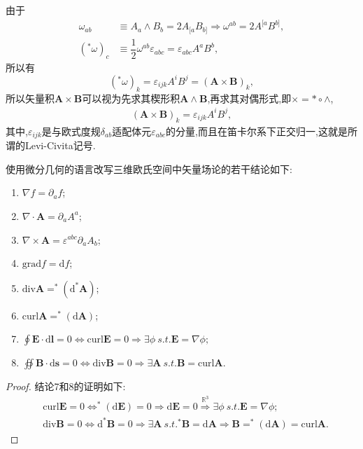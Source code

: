 由于
$$
\begin{aligned}
\omega_{ab}&\equiv A_a\wedge B_b=2A_{[a}B_{b]}\Rightarrow \omega^{ab}= 2A^{[a}B^{b]},\\
(^*\omega)_c&\equiv\dfrac{1}{2}\omega^{ab}\varepsilon_{abc}=\varepsilon_{abc}A^aB^b,
\end{aligned}
$$
所以有
$$
(^*\omega)_k=\varepsilon_{ijk}A^iB^j=(\boldsymbol{A}\times\boldsymbol{B})_k,
$$
所以矢量积$\boldsymbol{A}\times \boldsymbol{B}$可以视为先求其楔形积$\boldsymbol{A}\wedge\boldsymbol{B}$,再求其对偶形式,即$\times =*\circ \wedge$,
\begin{align}
    (\boldsymbol{A}\times \boldsymbol{B})_k=\varepsilon_{ijk}A^iB^j,
\end{align}
其中,$\varepsilon_{ijk}$是与欧式度规$\delta_{ab}$适配体元$\varepsilon_{abc}$的分量,而且在笛卡尔系下正交归一,这就是所谓的Levi-Civita记号.

使用微分几何的语言改写三维欧氏空间中矢量场论的若干结论如下:
\begin{enumerate}
\item $\nabla f=\partial_a f$;
\item $\nabla \cdot \boldsymbol{A}=\partial_a A^a$;
\item $\nabla \times \boldsymbol{A}=\varepsilon^{abc}\partial_aA_b$;
\item $\text{grad}f=\text{d}f$;
\item $\text{div}\boldsymbol{A}=^*(\text{d}^*\boldsymbol{A})$;
\item $\text{curl}\boldsymbol{A}=^*(\text{d}\boldsymbol{A})$;
\item $\displaystyle \oint\boldsymbol{E}\cdot \text{d}\boldsymbol{l}=0\Leftrightarrow\text{curl} \boldsymbol{E}=0\Rightarrow \exists \phi \ s.t. \boldsymbol{E}=\nabla \phi;$
\item $\displaystyle \oiint \boldsymbol{B}\cdot \text{d}\boldsymbol{s}=0\Leftrightarrow \text{div}\boldsymbol{B}=0\Rightarrow \exists \boldsymbol{A}\ s.t. \boldsymbol{B}=\text{curl}\boldsymbol{A}.$
\end{enumerate}
\begin{proof}
    结论7和8的证明如下:
    $$
    \begin{aligned}
       & \text{curl}\boldsymbol{E}=0\Leftrightarrow^*(\text{d}\boldsymbol{E})=0\Rightarrow\text{d}\boldsymbol{E}=0\stackrel{\mathbb{R}^3}{\Longrightarrow}\exists \phi \ s.t. \boldsymbol{E}=\nabla \phi;\\
    &\text{div}\boldsymbol{B}=0\Leftrightarrow \text{d}^*\boldsymbol{B}=0\Rightarrow \exists \boldsymbol{A}\ s.t. ^*\boldsymbol{B}=\text{d}\boldsymbol{A}\Rightarrow \boldsymbol{B}=^*(\text{d}\boldsymbol{A})=\text{curl}\boldsymbol{A}.
    \end{aligned}
        $$
    \end{proof}